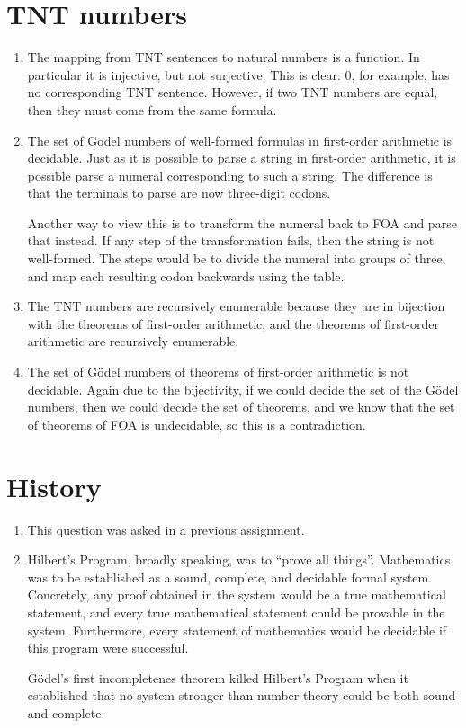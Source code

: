 \documentclass[11pt,letterpaper]{article}
\begin{document}
\section{TNT numbers}

\begin{enumerate}
  \item
    The mapping from TNT sentences to natural numbers is a function.
    In particular it is injective, but not surjective.
    This is clear: $0$, for example, has no corresponding TNT sentence.
    However, if two TNT numbers are equal, then they must come from the same
    formula.

  \item
    The set of Gödel numbers of well-formed formulas in first-order arithmetic
    is decidable.
    Just as it is possible to parse a string in first-order arithmetic, it is
    possible parse a numeral corresponding to such a string.
    The difference is that the terminals to parse are now three-digit codons.

    Another way to view this is to transform the numeral back to FOA and parse
    that instead. If any step of the transformation fails, then the string is
    not well-formed. The steps would be to divide the numeral into groups of
    three, and map each resulting codon backwards using the table.

  \item
    The TNT numbers are recursively enumerable because they are in bijection
    with the theorems of first-order arithmetic, and the theorems of
    first-order arithmetic are recursively enumerable.

  \item
    The set of Gödel numbers of theorems of first-order arithmetic is not
    decidable.
    Again due to the bijectivity, if we could decide the set of the Gödel
    numbers, then we could decide the set of theorems, and we know that the set
    of theorems of FOA is undecidable, so this is a contradiction.
\end{enumerate}

\section{History}

\begin{enumerate}
  \item
    This question was asked in a previous assignment.

  \item
    Hilbert's Program, broadly speaking, was to ``prove all things''.
    Mathematics was to be established as a sound, complete, and decidable
    formal system.
    Concretely, any proof obtained in the system would be a true mathematical
    statement, and every true mathematical statement could be provable in the
    system.
    Furthermore, every statement of mathematics would be decidable if this
    program were successful.

    Gödel's first incompletenes theorem killed Hilbert's Program when it
    established that no system stronger than number theory could be both sound
    and complete.
\end{enumerate}
\end{document}
